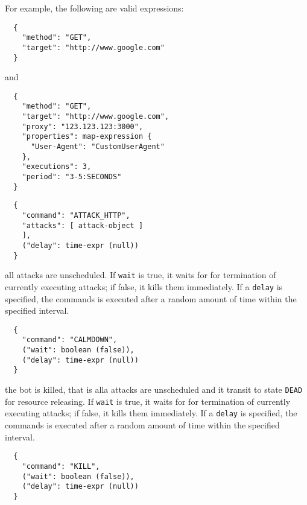 \begin{description}
  For example, the following are valid expressions:

  \begin{verbatim}
  {
    "method": "GET",
    "target": "http://www.google.com"
  }
  \end{verbatim}

  and

  \begin{verbatim}
  {
    "method": "GET",
    "target": "http://www.google.com",
    "proxy": "123.123.123:3000",
    "properties": map-expression {
      "User-Agent": "CustomUserAgent"
    },
    "executions": 3,
    "period": "3-5:SECONDS"
  }
  \end{verbatim}

\end{description}

\begin{description}
  \setlength\itemsep{1em}

  \item[ATTACK-HTTP] \lipsum[1]
  \begin{verbatim}
  {
    "command": "ATTACK_HTTP",
    "attacks": [ attack-object ]
    ],
    ("delay": time-expr (null))
  }
  \end{verbatim}

  \item[CALMDOWN] all attacks are unscheduled.
  If \texttt{wait} is true, it waits for for termination of currently executing attacks; if false, it kills them immediately.
  If a \texttt{delay} is specified, the commands is executed after a random amount of time within the specified interval.

  \begin{verbatim}
  {
    "command": "CALMDOWN",
    ("wait": boolean (false)),
    ("delay": time-expr (null))
  }
  \end{verbatim}

  \item[KILL] the bot is killed, that is alla attacks are unscheduled and it transit to state \texttt{DEAD} for resource releasing.
  If \texttt{wait} is true, it waits for for termination of currently executing attacks; if false, it kills them immediately.
  If a \texttt{delay} is specified, the commands is executed after a random amount of time within the specified interval.

  \begin{verbatim}
  {
    "command": "KILL",
    ("wait": boolean (false)),
    ("delay": time-expr (null))
  }
  \end{verbatim}


\end{description}
